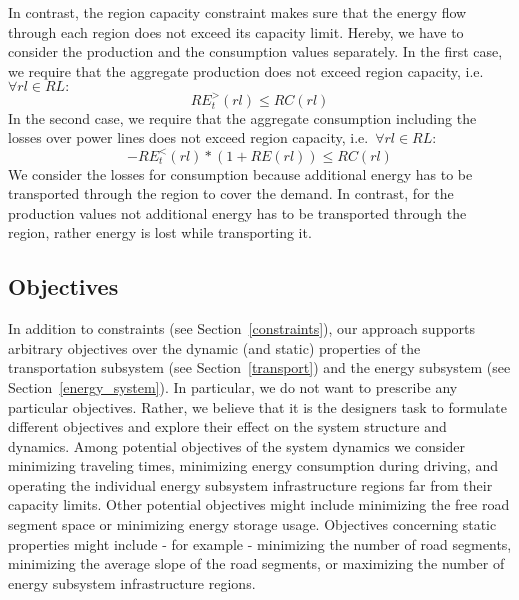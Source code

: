 In contrast, the region capacity constraint makes sure that the energy flow through each region does not exceed its capacity limit. Hereby, we have to consider the production and the consumption values separately. In the first case, we require that the aggregate production does not exceed region capacity, i.e.\ $\forall rl \in RL:$
\[
	RE_t^>(rl) \leq RC(rl)
\]
In the second case, we require that the aggregate consumption including the losses over power lines does not exceed region capacity, i.e.\ $\forall rl \in RL:$
\[
	- RE_t^<(rl) * (1 + RE(rl)) \leq RC(rl)
\]
We consider the losses for consumption because additional energy has to be transported through the region to cover the demand. In contrast, for the production values not additional energy has to be transported through the region, rather energy is lost while transporting it.

\subsection{Objectives}
\label{objectives}

In addition to constraints (see Section~\ref{constraints}), our approach supports arbitrary objectives over the dynamic (and static) properties of the transportation subsystem (see Section~\ref{transport}) and the energy subsystem (see Section~\ref{energy_system}). In particular, we do not want to prescribe any particular objectives. Rather, we believe that it is the designers task to formulate different objectives and explore their effect on the system structure and dynamics. Among potential objectives of the system dynamics we consider minimizing traveling times, minimizing energy consumption during driving, and operating the individual energy subsystem infrastructure regions far from their capacity limits. Other potential objectives might include minimizing the free road segment space or minimizing energy storage usage. Objectives concerning static properties might include - for example - minimizing the number of road segments, minimizing the average slope of the road segments, or maximizing the number of energy subsystem infrastructure regions.